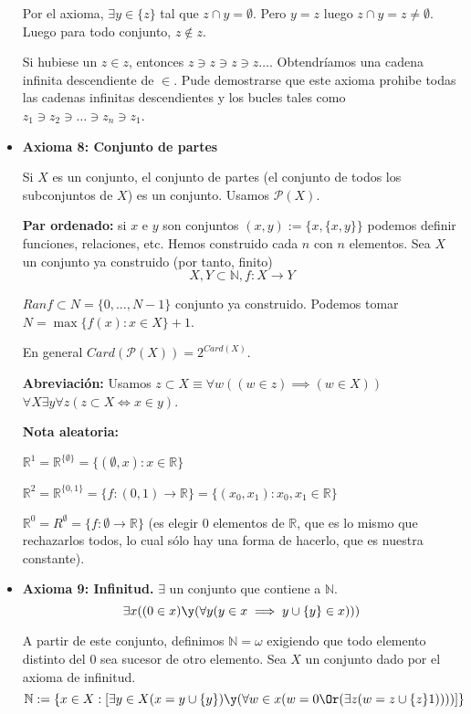 \begin{itemize}
		 Por el axioma, $\exists y\in\{z\}$ tal que $z\cap y=\emptyset$. Pero $y=z$ luego $z\cap y = z \neq \emptyset$. Luego para todo conjunto, $z\notin z$.
		 
		 \begin{obs}
		 	Si hubiese un $z\in z$, entonces $z\ni z\ni z\ni z\hdots$. Obtendríamos una cadena infinita descendiente de $\in$.
		 	Pude demostrarse que este axioma prohibe todas las cadenas infinitas descendientes y los bucles tales como $z_1\ni z_2\ni \hdots \ni z_n \ni z_1$.
		 \end{obs}
		 
		 \item \textbf{Axioma 8: Conjunto de partes}

		 Si $X$ es un conjunto, el conjunto de partes (el conjunto de todos los subconjuntos de $X$) es un conjunto. Usamos $\mathcal{P}(X)$.
		 
		 \textbf{Par ordenado:} si $x$ e $y$ son conjuntos $(x,y):=\{x, \{x,y\} \}$ podemos definir funciones, relaciones, etc. Hemos construido cada $n$ con $n$ elementos. Sea $X$ un conjunto ya construido (por tanto, finito)
		 $$X,Y \subset \mathbb{N}, f:X\to Y$$
		 
		 $Ran f \subset N = \{0, \hdots, N-1\}$ conjunto ya construido. Podemos tomar $N = \max \{f(x): x \in X\} + 1$.
		 
		 En general $Card(\mathcal{P}(X)) = 2^{Card(X)}$.
		 
		 \textbf{Abreviación: } Usamos $z\subset X \equiv \forall w((w\in z)\implies (w\in X))$
		 $\forall X \exists y \forall z(z\subset X\iff x\in y)$.
		 
		 \textbf{Nota aleatoria:}
		 
		 $\mathbb{R}^1 = \mathbb{R}^{\{\emptyset\}} = \{(\emptyset, x): x\in\mathbb{R}\}$
		 
		 $\mathbb{R}^2 = \mathbb{R}^{\{0,1\}} = \{f:(0,1)\to \mathbb{R}\} = \{(x_0, x_1): x_0, x_1 \in \mathbb{R}\}$
		 
		 $\mathbb{R}^0 = R^\emptyset = \{f:\emptyset\to \mathbb{R}\}$ (es elegir 0 elementos de $\mathbb{R}$, que es lo mismo que rechazarlos todos, lo cual sólo hay una forma de hacerlo, que es nuestra constante).
		 
		 \item \textbf{Axioma 9: Infinitud.}
		 $\exists$ un conjunto que contiene a $\mathbb{N}$.
		 $$\exists x ((0\in x)\y (\forall y(y\in x \implies y\cup \{y\} \in x)))$$
		 
		 A partir de este conjunto, definimos $\mathbb{N} = \omega$ exigiendo que todo elemento distinto del 0 sea sucesor de otro elemento. Sea $X$ un conjunto dado por el axioma de infinitud.
		 $$\mathbb{N}:= \{x\in X:\left[\exists y \in X (x=y\cup \{y\})\y (\forall w\in x (w=0\Or (\exists z(w=z\cup \{z\}1)))) \right]\}$$
		 

\end{itemize}

